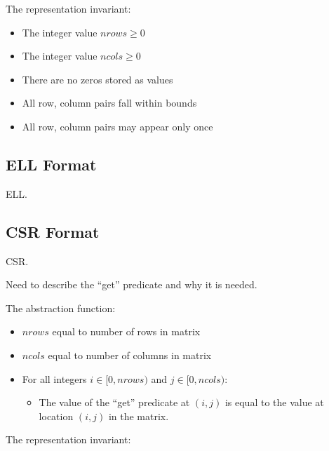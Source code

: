 \documentclass[11pt,conference]{IEEEtran}
\begin{document}
The representation invariant:

\begin{itemize}
  \item The integer value \(nrows \geq 0\)
  \item The integer value \(ncols \geq 0\)
	\item There are no zeros stored as values
	\item All row, column pairs fall within bounds
	\item All row, column pairs may appear only once
\end{itemize}

\subsection{ELL Format}

ELL.

\subsection{CSR Format}

CSR.

Need to describe the ``get'' predicate and why it is needed.

The abstraction function:

\begin{itemize}
  \item \(nrows\) equal to number of rows in matrix
  \item \(ncols\) equal to number of columns in matrix
  \item For all integers \(i \in [0, nrows)\) and \(j \in [0, ncols)\):
  \begin{itemize}
    \item The value of the ``get'' predicate at \((i, j)\) is equal to the value at location \((i, j)\) in the matrix.
  \end{itemize}
\end{itemize}

The representation invariant:
\end{document}
